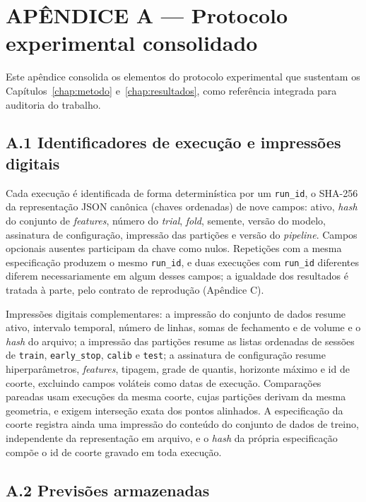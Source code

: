 \appendix

\chapter*{APÊNDICE A --- Protocolo experimental consolidado}

Este apêndice consolida os elementos do protocolo experimental que sustentam os Capítulos~\ref{chap:metodo} e~\ref{chap:resultados}, como referência integrada para auditoria do trabalho.

\section*{A.1 Identificadores de execução e impressões digitais}

Cada execução é identificada de forma determinística por um \texttt{run\_id}, o SHA-256 da representação JSON canônica (chaves ordenadas) de nove campos: ativo, \textit{hash} do conjunto de \textit{features}, número do \textit{trial}, \textit{fold}, semente, versão do modelo, assinatura de configuração, impressão das partições e versão do \textit{pipeline}. Campos opcionais ausentes participam da chave como nulos. Repetições com a mesma especificação produzem o mesmo \texttt{run\_id}, e duas execuções com \texttt{run\_id} diferentes diferem necessariamente em algum desses campos; a igualdade dos resultados é tratada à parte, pelo contrato de reprodução (Apêndice C).

Impressões digitais complementares: a impressão do conjunto de dados resume ativo, intervalo temporal, número de linhas, somas de fechamento e de volume e o \textit{hash} do arquivo; a impressão das partições resume as listas ordenadas de sessões de \texttt{train}, \texttt{early\_stop}, \texttt{calib} e \texttt{test}; a assinatura de configuração resume hiperparâmetros, \textit{features}, tipagem, grade de quantis, horizonte máximo e id de coorte, excluindo campos voláteis como datas de execução. Comparações pareadas usam execuções da mesma coorte, cujas partições derivam da mesma geometria, e exigem interseção exata dos pontos alinhados. A especificação da coorte registra ainda uma impressão do conteúdo do conjunto de dados de treino, independente da representação em arquivo, e o \textit{hash} da própria especificação compõe o id de coorte gravado em toda execução.

\section*{A.2 Previsões armazenadas}

